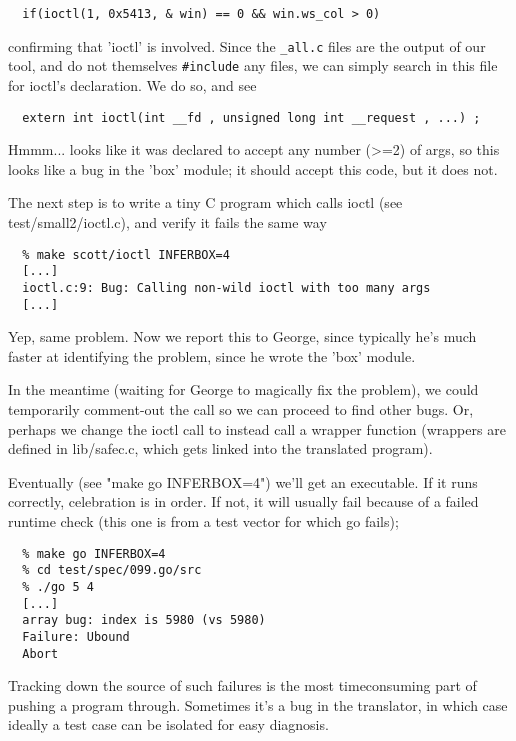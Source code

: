 \documentclass{book}
\def\t#1{{\tt #1}}
\begin{document}
\begin{verbatim}
  if(ioctl(1, 0x5413, & win) == 0 && win.ws_col > 0)
\end{verbatim}

confirming that 'ioctl' is involved.  Since the \t{*\_all.c} files are the
output of our tool, and do not themselves \t{\#include} any files, we can
simply search in this file for ioctl's declaration.  We do so, and see

\begin{verbatim}
  extern int ioctl(int __fd , unsigned long int __request , ...) ;
\end{verbatim}
  
Hmmm... looks like it was declared to accept any number (>=2) of args, so
this looks like a bug in the 'box' module; it should accept this code,
but it does not.

The next step is to write a tiny C program which calls ioctl (see
test/small2/ioctl.c), and verify it fails the same way

\begin{verbatim}
  % make scott/ioctl INFERBOX=4
  [...]
  ioctl.c:9: Bug: Calling non-wild ioctl with too many args
  [...]
\end{verbatim}
  
Yep, same problem.  Now we report this to George, since typically he's
much faster at identifying the problem, since he wrote the 'box' module.

In the meantime (waiting for George to magically fix the problem), we
could temporarily comment-out the call so we can proceed to find other
bugs.  Or, perhaps we change the ioctl call to instead call a wrapper
function (wrappers are defined in lib/safec.c, which gets linked into
the translated program).

Eventually (see "make go INFERBOX=4") we'll get an executable.  If it
runs correctly, celebration is in order.  If not, it will usually fail
because of a failed runtime check (this one is from a test vector for
which go fails);

\begin{verbatim}
  % make go INFERBOX=4
  % cd test/spec/099.go/src
  % ./go 5 4
  [...]
  array bug: index is 5980 (vs 5980)
  Failure: Ubound
  Abort
\end{verbatim}

Tracking down the source of such failures is the most timeconsuming
part of pushing a program through.  Sometimes it's a bug in the
translator, in which case ideally a test case can be isolated for easy
diagnosis.  
\end{document}
